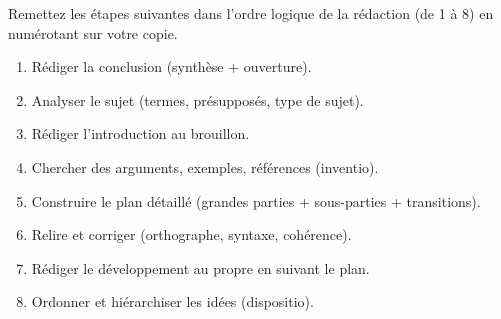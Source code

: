 \documentclass[11pt]{article}
\begin{document}
\begin{exercice}
Remettez les étapes suivantes dans l'ordre logique de la rédaction (de 1 à 8) en numérotant sur votre copie.
\begin{enumerate}
    \item Rédiger la conclusion (synthèse + ouverture).
    \item Analyser le sujet (termes, présupposés, type de sujet).
    \item Rédiger l'introduction au brouillon.
    \item Chercher des arguments, exemples, références (inventio).
    \item Construire le plan détaillé (grandes parties + sous-parties + transitions).
    \item Relire et corriger (orthographe, syntaxe, cohérence).
    \item Rédiger le développement au propre en suivant le plan.
    \item Ordonner et hiérarchiser les idées (dispositio).
\end{enumerate}
\end{exercice}
\end{document}
